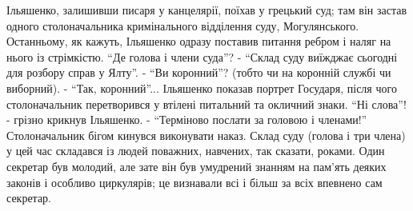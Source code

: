 \documentclass[a4paper,20pt]{report}
\begin{document}
Ільяшенко, залишивши писаря у канцелярії, поїхав у грецький суд; там він застав
одного столоначальника кримінального відділення суду, Могулянського.
Останньому, як кажуть, Ільяшенко одразу поставив питання ребром і наляг на
нього із стрімкістю. ``Де голова і члени суда''? - ``Склад суду виїжджає
сьогодні для розбору справ у Ялту''. - ``Ви коронний''? (тобто чи на коронній
службі чи виборний). - ``Так, коронний''... Ільяшенко показав портрет Государя,
після чого столоначальник перетворився у втілені питальний та окличний знаки.
``Ні слова''! - грізно крикнув Ільяшенко. - ``Терміново послати за головою і
членами!'' Столоначальник бігом кинувся виконувати наказ. Склад суду (голова і
три члена) у цей час складався із людей поважних, навчених, так сказати,
роками. Один секретар був молодий, але зате він був умудрений знанням на
пам'ять деяких законів і особливо циркулярів; це визнавали всі і більш за всіх
впевнено сам секретар.

\end{document}
